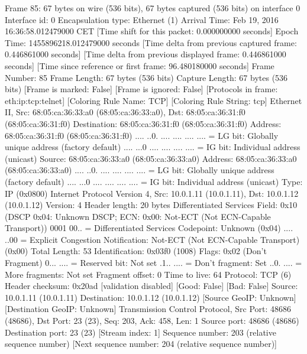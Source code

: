 Frame 85: 67 bytes on wire (536 bits), 67 bytes captured (536 bits) on interface 0
    Interface id: 0
    Encapsulation type: Ethernet (1)
    Arrival Time: Feb 19, 2016 16:36:58.012479000 CET
    [Time shift for this packet: 0.000000000 seconds]
    Epoch Time: 1455896218.012479000 seconds
    [Time delta from previous captured frame: 0.446861000 seconds]
    [Time delta from previous displayed frame: 0.446861000 seconds]
    [Time since reference or first frame: 96.480180000 seconds]
    Frame Number: 85
    Frame Length: 67 bytes (536 bits)
    Capture Length: 67 bytes (536 bits)
    [Frame is marked: False]
    [Frame is ignored: False]
    [Protocols in frame: eth:ip:tcp:telnet]
    [Coloring Rule Name: TCP]
    [Coloring Rule String: tcp]
Ethernet II, Src: 68:05:ca:36:33:a0 (68:05:ca:36:33:a0), Dst: 68:05:ca:36:31:f0 (68:05:ca:36:31:f0)
    Destination: 68:05:ca:36:31:f0 (68:05:ca:36:31:f0)
        Address: 68:05:ca:36:31:f0 (68:05:ca:36:31:f0)
        .... ..0. .... .... .... .... = LG bit: Globally unique address (factory default)
        .... ...0 .... .... .... .... = IG bit: Individual address (unicast)
    Source: 68:05:ca:36:33:a0 (68:05:ca:36:33:a0)
        Address: 68:05:ca:36:33:a0 (68:05:ca:36:33:a0)
        .... ..0. .... .... .... .... = LG bit: Globally unique address (factory default)
        .... ...0 .... .... .... .... = IG bit: Individual address (unicast)
    Type: IP (0x0800)
Internet Protocol Version 4, Src: 10.0.1.11 (10.0.1.11), Dst: 10.0.1.12 (10.0.1.12)
    Version: 4
    Header length: 20 bytes
    Differentiated Services Field: 0x10 (DSCP 0x04: Unknown DSCP; ECN: 0x00: Not-ECT (Not ECN-Capable Transport))
        0001 00.. = Differentiated Services Codepoint: Unknown (0x04)
        .... ..00 = Explicit Congestion Notification: Not-ECT (Not ECN-Capable Transport) (0x00)
    Total Length: 53
    Identification: 0x03f0 (1008)
    Flags: 0x02 (Don't Fragment)
        0... .... = Reserved bit: Not set
        .1.. .... = Don't fragment: Set
        ..0. .... = More fragments: Not set
    Fragment offset: 0
    Time to live: 64
    Protocol: TCP (6)
    Header checksum: 0x20ad [validation disabled]
        [Good: False]
        [Bad: False]
    Source: 10.0.1.11 (10.0.1.11)
    Destination: 10.0.1.12 (10.0.1.12)
    [Source GeoIP: Unknown]
    [Destination GeoIP: Unknown]
Transmission Control Protocol, Src Port: 48686 (48686), Dst Port: 23 (23), Seq: 203, Ack: 458, Len: 1
    Source port: 48686 (48686)
    Destination port: 23 (23)
    [Stream index: 1]
    Sequence number: 203    (relative sequence number)
    [Next sequence number: 204    (relative sequence number)]
